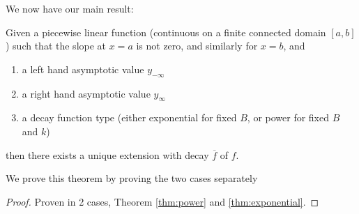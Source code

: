 \documentclass[10pt]{article}
\begin{document}
We now have our main result:
\begin{theorem}
\label{thm:main}
Given a piecewise linear function (continuous on a finite connected domain $[a,b]$) such
that the slope at $x=a$ is not zero, and similarly for $x=b$, and
\begin{enumerate}
\item a left hand asymptotic value $y_{-\infty}$
\item a right hand asymptotic value $y_{\infty}$
\item a decay function type (either exponential for fixed $B$, or power for fixed $B$ and $k$)
\end{enumerate}
then there exists a unique extension with decay $\overline{f}$ of $f$.
\end{theorem}
We prove this theorem by proving the two cases separately
\begin{proof}
Proven in 2 cases, Theorem \ref{thm:power} and \ref{thm:exponential}.
\end{proof}
\end{document}
